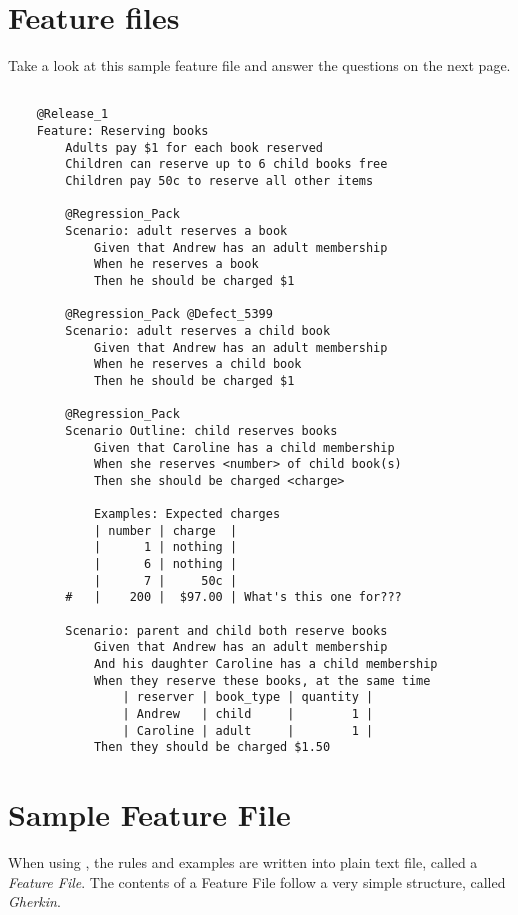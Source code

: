 \chapter*{Feature files}

Take a look at this sample feature file and answer the questions on the next page.

\begin{verbatim}

    @Release_1
    Feature: Reserving books
        Adults pay $1 for each book reserved
        Children can reserve up to 6 child books free
        Children pay 50c to reserve all other items
        
        @Regression_Pack
        Scenario: adult reserves a book
            Given that Andrew has an adult membership
            When he reserves a book
            Then he should be charged $1

        @Regression_Pack @Defect_5399
        Scenario: adult reserves a child book
            Given that Andrew has an adult membership
            When he reserves a child book
            Then he should be charged $1

        @Regression_Pack
        Scenario Outline: child reserves books
            Given that Caroline has a child membership
            When she reserves <number> of child book(s)
            Then she should be charged <charge>
            
            Examples: Expected charges
            | number | charge  |
            |      1 | nothing |     
            |      6 | nothing |
            |      7 |     50c |
        #   |    200 |  $97.00 | What's this one for???

        Scenario: parent and child both reserve books
            Given that Andrew has an adult membership
            And his daughter Caroline has a child membership
            When they reserve these books, at the same time
                | reserver | book_type | quantity |
                | Andrew   | child     |        1 |
                | Caroline | adult     |        1 |
            Then they should be charged $1.50
\end{verbatim}


\chapter*{Sample Feature File}

When using \CUKE, the rules and examples are written into plain text file, called a \emph{Feature File}. The contents of a Feature File follow a very simple structure, called \emph{Gherkin}.

